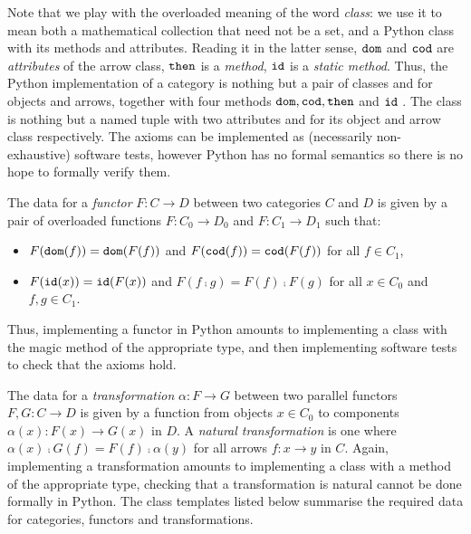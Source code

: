 Note that we play with the overloaded meaning of the word \emph{class}: we use it to mean both a mathematical collection that need not be a set, and a Python class with its methods and attributes.
Reading it in the latter sense, $\mathtt{dom}$ and $\mathtt{cod}$ are \emph{attributes} of the arrow class, $\mathtt{then}$ is a \emph{method}, $\mathtt{id}$ is a \emph{static method}.
Thus, the Python implementation of a category is nothing but a pair of classes  and  for objects and arrows, together with four methods $\mathtt{dom}, \mathtt{cod}, \mathtt{then}$ and $\mathtt{id}$ .
The  class is nothing but a named tuple with two attributes  and  for its object and arrow class respectively.
The axioms can be implemented as (necessarily non-exhaustive) software tests, however Python has no formal semantics so there is no hope to formally verify them.

The data for a \emph{functor} $F : C \to D$ between two categories $C$ and $D$ is given by a pair of overloaded functions $F : C_0 \to D_0$ and $F : C_1 \to D_1$ such that:
\begin{itemize}
    \item $F(\mathtt{dom}(f)) = \mathtt{dom}(F(f))$ and $F(\mathtt{cod}(f)) = \mathtt{cod}(F(f))$ for all $f \in C_1$,
    \item $F(\mathtt{id}(x)) = \mathtt{id}(F(x))$ and $F(f \fcmp g) = F(f) \fcmp F(g)$ for all $x \in C_0$ and $f, g \in C_1$.
\end{itemize}
Thus, implementing a functor in Python amounts to implementing a class with the magic method  of the appropriate type, and then implementing software tests to check that the axioms hold.

The data for a \emph{transformation} $\alpha : F \to G$ between two parallel functors $F, G : C \to D$ is given by a function from objects $x \in C_0$ to components $\alpha(x) : F(x) \to G(x)$ in $D$.
A \emph{natural transformation} is one where $\alpha(x) \fcmp G(f) = F(f) \fcmp \alpha(y)$ for all arrows $f : x \to y$ in $C$.
Again, implementing a transformation amounts to implementing a class with a  method of the appropriate type, checking that a transformation is natural cannot be done formally in Python.
The class templates listed below summarise the required data for categories, functors and transformations.

